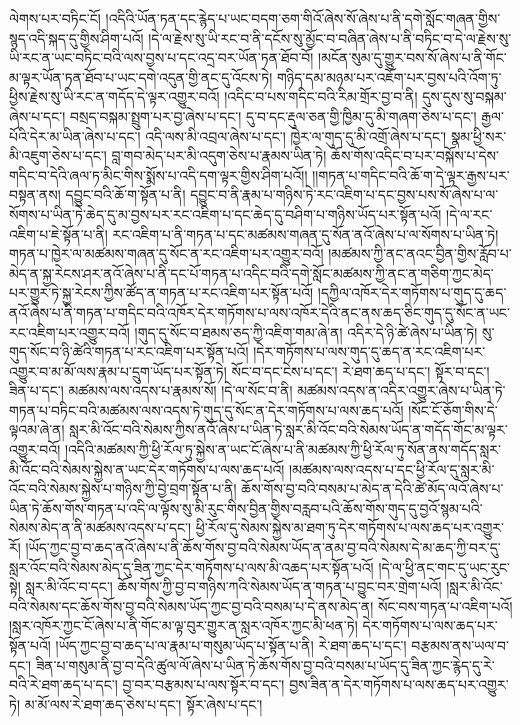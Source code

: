 ལེགས་པར་བཏིང་ངོ། །འདིའི་ཡོན་ཏན་དང་རྙེད་པ་ཡང་བདག་ཅག་གིའོ་ཞེས་སོ་ཞེས་པ་ནི་དགེ་སློང་གཞན་གྱིས་སྙད་འདི་སྐད་དུ་གྱིས་ཤིག་པའོ། །དེ་ལ་རྗེས་སུ་ཡི་རང་བ་ནི་དངོས་སུ་མྱོང་བ་བཞིན་ཞེས་པ་ནི་བཏིང་བ་དེ་ལ་རྗེས་སུ་ཡི་རང་ན་ཡང་བཏིང་བའི་ལས་བྱས་པ་དང་འདྲ་བར་ཡོན་ཏན་ཐོབ་བོ། །མངོན་སུམ་དུ་གྱུར་བས་སོ་ཞེས་པ་ནི་གོང་མ་ལྟར་ཡོན་ཏན་ཐོབ་པ་ཡང་དགེ་འདུན་གྱི་ནང་དུ་འོངས་ཏེ། གཉིད་དམ་མཉམ་པར་འཇོག་པར་བྱས་པའི་འོག་ཏུ་ཕྱིས་རྗེས་སུ་ཡི་རང་ན་གདོད་དེ་ལྟར་འགྱུར་བའོ། །འདིང་བ་པས་གདིང་བའི་རིམ་གྲོར་བྱ་བ་ནི། དུས་དུས་སུ་བསྐམ་ཞེས་པ་དང་། བསྲད་བསྐམ་སྤྲུག་པར་བྱ་ཞེས་པ་དང་། དུ་བ་དང་རྡུལ་ཅན་གྱི་ཁྱིམ་དུ་མི་གཞག་ཅེས་པ་དང་། རྒྱལ་པོའི་དེར་མ་ཡིན་ཞེས་པ་དང་། འདི་ལས་མི་འབྲལ་ཞེས་པ་དང་། ཁྱེར་ལ་གུད་དུ་མི་འགྲོ་ཞེས་པ་དང་། སྣམ་ཕྱི་སར་མི་འཇུག་ཅེས་པ་དང་། བླ་གབ་མེད་པར་མི་འདུག་ཅེས་པ་རྣམས་ཡིན་ཏེ། ཆོས་གོས་འདིང་བ་པར་བསྐོས་པ་དེས་གདིང་བ་དེའི་ཞལ་ཏ་མིང་གིས་སྨོས་པ་འདི་དག་ལྟར་གྱིས་ཤིག་པའོ།། །།གཏན་པ་གདིང་བའི་ཆོ་ག་དེ་ལྟར་རྒྱས་པར་བསྟན་ནས། དབྱུང་བའི་ཆོ་ག་སྟོན་པ་ནི། དབྱུང་བ་ནི་རྣམ་པ་གཉིས་ཏེ་རང་འཇིག་པ་དང་བྱས་པས་སོ་ཞེས་པ་ལ་སོགས་པ་ཡིན་ཏེ་ཆེད་དུ་མ་བྱས་པར་རང་འཇིག་པ་དང་ཆེད་དུ་བཤིག་པ་གཉིས་ཡོད་པར་སྟོན་པའོ། །དེ་ལ་རང་འཇིག་པ་ཇེ་སྟོན་པ་ནི། རང་འཇིག་པ་ནི་གཏན་པ་དང་མཚམས་གཞན་དུ་སོན་ནའོ་ཞེས་པ་ལ་སོགས་པ་ཡིན་ཏེ། གཏན་པ་ཁྱེར་ལ་མཚམས་གཞན་དུ་སོང་ན་རང་འཇིག་པར་འགྱུར་བའོ། །མཚམས་ཀྱི་ནང་ནའང་བྱིན་གྱིས་རློབ་པ་མེད་ན་སྐྱ་རེངས་ཤར་ནའོ་ཞེས་པ་ནི་དང་པོ་གཏན་པ་འདིང་བའི་དགེ་སློང་མཚམས་ཀྱི་ནང་ན་གཅིག་ཀྱང་མེད་པར་གྱུར་ཏེ་སྐྱ་རེངས་ཀྱིས་ཚོད་ན་གཏན་པ་རང་འཇིག་པར་སྟོན་པའོ། །དཀྱིལ་འཁོར་དེར་གཏོགས་པ་གུད་དུ་ཆད་ནའོ་ཞེས་པ་ནི་གཏན་པ་གདིང་བའི་འཁོར་དེར་གཏོགས་པ་ལས་འཁོར་དེའི་ནང་ནས་ཆད་ཅིང་གུད་དུ་སོང་ན་ཡང་རང་འཇིག་པར་འགྱུར་བའོ། །གུད་དུ་སོང་བ་ཐམས་ཅད་ཀྱི་འཇིག་གམ་ཞེ་ན། འདིར་དེ་ཉི་ཚེ་ཞེས་པ་ཡིན་ཏེ། སུ་གུད་སོང་བ་ཉི་ཚེའི་གཏན་པ་རང་འཇིག་པར་སྟོན་པའོ། །དེར་གཏོགས་པ་ལས་གུད་དུ་ཆད་ན་རང་འཇིག་པར་འགྱུར་བ་མ་མོ་ལས་རྣམ་པ་དྲུག་ཡོད་པར་སྟོན་ཏེ། སོང་བ་དང་ངེས་པ་དང་། རེ་ཐག་ཆད་པ་དང་། སྟོར་བ་དང་། ཟིན་པ་དང་། མཚམས་ལས་འདས་པ་རྣམས་སོ། །དེ་ལ་སོང་བ་ནི། མཚམས་འདས་ན་འདིར་འགྱུར་ཞེས་པ་ཡིན་ཏེ་གཏན་པ་བཏིང་བའི་མཚམས་ལས་འདས་ཏེ་གུད་དུ་སོང་ན་དེར་གཏོགས་པ་ལས་ཆད་པའོ། །སོང་ངོ་ཅོག་གིས་དེ་ལྟའམ་ཞེ་ན། སླར་མི་འོང་བའི་སེམས་ཀྱིས་ནའོ་ཞེས་པ་ཡིན་ཏེ་སླར་མི་འོང་བའི་སེམས་ཡོད་ན་གདོད་གོང་མ་ལྟར་འགྱུར་བའོ། །འདིའི་མཚམས་ཀྱི་ཕྱི་རོལ་ཏུ་སྐྱེས་ན་ཡང་ངོ་ཞེས་པ་ནི་མཚམས་ཀྱི་ཕྱི་རོལ་ཏུ་སོན་ནས་གདོད་སླར་མི་འོང་བའི་སེམས་སྐྱེས་ན་ཡང་དེར་གཏོགས་པ་ལས་ཆད་པའོ། །མཚམས་ལས་འདས་པ་དང་ཕྱི་རོལ་དུ་སླར་མི་འོང་བའི་སེམས་སྐྱེས་པ་གཉིས་ཀྱི་བྱེ་བྲག་སྟོན་པ་ནི། ཆོས་གོས་བྱ་བའི་བསམ་པ་མེད་ན་དེའི་ཚེ་མོད་ལའོ་ཞེས་པ་ཡིན་ཏེ་ཆོས་གོས་གཏན་པ་འདི་ལ་ལྟོས་སུ་མི་རུང་གིས་བྱིན་གྱིས་བརླབ་པའི་ཆོས་གོས་གུད་དུ་བྱའོ་སྙམ་པའི་སེམས་མེད་ན་ནི་མཚམས་འདས་པ་དང་། ཕྱི་རོལ་དུ་སེམས་སྐྱེས་མ་ཐག་ཏུ་དེར་གཏོགས་པ་ལས་ཆད་པར་འགྱུར་རོ། །ཡོད་ཀྱང་བྱ་བ་ཆད་ནའོ་ཞེས་པ་ནི་ཆོས་གོས་བྱ་བའི་སེམས་ཡོད་ན་ནམ་བྱ་བའི་སེམས་དེ་མ་ཆད་ཀྱི་བར་དུ་སླར་འོང་བའི་སེམས་མེད་དུ་ཟིན་ཀྱང་དེར་གཏོགས་པ་ལས་མི་འཆད་པར་སྟོན་པའོ། །དེ་ལ་ཕྱི་ནང་གང་དུ་ཡང་རུང་སྟེ། སླར་མི་འོང་བ་དང་། ཆོས་གོས་ཀྱི་བྱ་བ་གཉིས་ཀའི་སེམས་ཡོད་ན་གཏན་པ་བྱུང་བར་གྲེག་པའོ། །སླར་མི་འོང་བའི་སེམས་དང་ཆོས་གོས་བྱ་བའི་སེམས་ཡོད་ཀྱང་བྱ་བའི་བསམ་པ་དེ་ནས་མེད་ན། སོང་བས་གཏན་པ་འཇིག་པའོ། །སླར་འཁོར་ཀྱང་ངོ་ཞེས་པ་ནི་གོང་མ་ལྟ་བུར་གྱུར་ན་སླར་འཁོར་ཀྱང་མི་ཕན་ཏེ། དེར་གཏོགས་པ་ལས་ཆད་པར་སྟོན་པའོ། །ཡོད་ཀྱང་བྱ་བ་ཆད་པ་ལ་རྣམ་པ་གསུམ་ཡོད་པ་སྟོན་པ་ནི། རེ་ཐག་ཆད་པ་དང་། བརྩམས་ནས་ཡལ་བ་དང་། ཟིན་པ་གསུམ་ནི་བྱ་བ་དེའི་ཚུལ་ལོ་ཞེས་པ་ཡིན་ཏེ་ཆོས་གོས་བྱ་བའི་བསམ་པ་ཡོད་དུ་ཟིན་ཀྱང་རྙེད་དུ་རེ་བའི་རེ་ཐག་ཆད་པ་དང་། བྱ་བར་བརྩམས་པ་ལས་སྟོར་བ་དང་། བྱས་ཟིན་ན་དེར་གཏོགས་པ་ལས་ཆད་པར་འགྱུར་ཏེ། མ་མོ་ལས་རེ་ཐག་ཆད་ཅེས་པ་དང་། སྟོར་ཞེས་པ་དང་། 